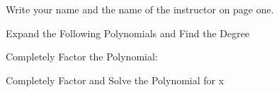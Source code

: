 \documentclass[11pt]{exam}
\begin{document}
\begin{questions}


\question[5] Write your name and the name of the instructor on page one. 

\addpoints
\question Expand the Following Polynomials and Find the Degree

\addpoints
\question Completely Factor the Polynomial:


\newpage


\addpoints
\question Completely Factor and Solve the Polynomial for x
\end{questions}
\end{document}
